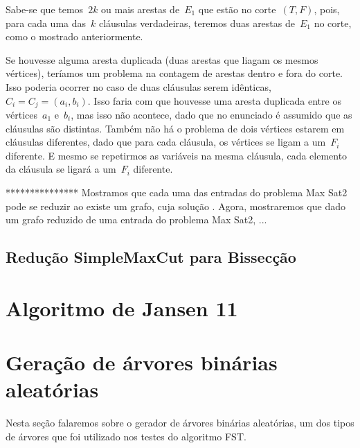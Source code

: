 \documentclass[a4paper,12pt]{article}
\begin{document}
		Sabe-se que temos~$2k$ ou mais arestas de~$E_1$ que estão no
		corte~$(T,F)$, pois, para cada uma das~$k$ cláusulas
		verdadeiras, teremos duas arestas de~$E_1$ no corte, como
		o mostrado anteriormente.

		Se houvesse alguma aresta duplicada (duas arestas que liagam
		os mesmos vértices), teríamos um problema na contagem de
		arestas dentro e fora do corte.
		Isso poderia ocorrer no caso de duas cláusulas serem 
		idênticas,~$C_i=C_j=(a_i,b_i)$.
		Isso faria com que houvesse uma aresta duplicada entre
		os vértices~$a_1$ e~$b_i$, mas isso não acontece, dado que
		no enunciado é assumido que as cláusulas são distintas.
		Também não há o problema de dois vértices estarem em cláusulas
		diferentes, dado que para cada cláusula, os vértices se ligam
		a um~$F_i$ diferente.
		E mesmo se repetirmos as variáveis na mesma cláusula, cada
		elemento da cláusula se ligará a um~$F_i$ diferente.

		\bigskip

***************
		Mostramos que cada uma das entradas do problema Max Sat2
		pode se reduzir ao existe um grafo, cuja solução .
		Agora, mostraremos que dado um grafo reduzido de uma entrada
		do problema Max Sat2, ...

	\subsection{Redução SimpleMaxCut para Bissecção}



\section {Algoritmo de Jansen 11}



\newpage

\section {Geração de árvores binárias aleatórias}
	Nesta seção falaremos sobre o gerador de árvores binárias 
	aleatórias, um dos tipos de árvores que foi utilizado nos 
	testes do algoritmo FST.
\end{document}
